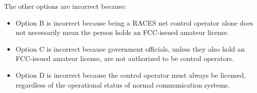 The other options are incorrect because:
\begin{itemize}
    \item Option B is incorrect because being a RACES net control operator alone does not necessarily mean the person holds an FCC-issued amateur license.
    \item Option C is incorrect because government officials, unless they also hold an FCC-issued amateur license, are not authorized to be control operators.
    \item Option D is incorrect because the control operator must always be licensed, regardless of the operational status of normal communication systems.
\end{itemize}

